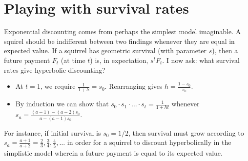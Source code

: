 \section{Playing with survival rates}
Exponential discounting comes from perhaps the simplest model imaginable. A squirel should be indifferent
between two findings whenever they are equal in expected value. If a squirrel has geometric survival (with parameter
$s$), then a future payment $F_t$ (at time $t$) is, in expectation, $s^t F_t$. I now ask: what survival rates give
hyperbolic discounting? 
\begin{itemize}
    \item At $t = 1$, we require $\frac{1}{1 + h} = s_0$. Rearranging gives $h = \frac{1 - s_0}{s_0}$. 
    \item By induction we can show that $s_0\cdot s_1 \cdot \ldots \cdot s_t = \frac{1}{1 + ht}$ whenever
        $s_a = \frac{ (a - 1) - (a - 2)s_0}{a - (a - 1)s_0}$. 
\end{itemize}
For instance, if initial survival is $s_0 = 1/2$, then survival must grow according to $s_a = \frac{a+1}{a+2} = \frac{2}{3}, \frac{3}{4}, 
\frac{4}{5},\ldots$ in order for a squirrel to discount hyperbolically in the simplistic model wherein a future payment is equal to
its expected value.

